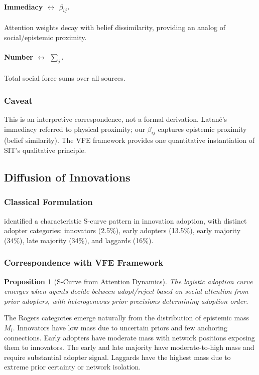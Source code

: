 \documentclass[12pt]{article}
\newtheorem{proposition}[theorem]{Proposition}
\begin{document}
\paragraph{Immediacy $\leftrightarrow$ $\beta_{ij}$.} Attention weights decay with 
belief dissimilarity, providing an analog of social/epistemic proximity.

\paragraph{Number $\leftrightarrow$ $\sum_j$.} Total social force sums over all sources.

\subsubsection{Caveat}

This is an interpretive correspondence, not a formal derivation. Latané's 
immediacy referred to physical proximity; our $\beta_{ij}$ captures epistemic 
proximity (belief similarity). The VFE framework provides one quantitative 
instantiation of SIT's qualitative principle.

\subsection{Diffusion of Innovations}

\subsubsection{Classical Formulation}

\citet{rogers2003diffusion} identified a characteristic S-curve pattern in innovation adoption, with distinct adopter categories: innovators (2.5\%), early adopters (13.5\%), early majority (34\%), late majority (34\%), and laggards (16\%).

\subsubsection{Correspondence with VFE Framework}

\begin{proposition}[S-Curve from Attention Dynamics]
The logistic adoption curve emerges when agents decide between adopt/reject based on social attention from prior adopters, with heterogeneous prior precisions determining adoption order.
\end{proposition}

The Rogers categories emerge naturally from the distribution of epistemic mass $M_i$. Innovators have low mass due to uncertain priors and few anchoring connections. Early adopters have moderate mass with network positions exposing them to innovators. The early and late majority have moderate-to-high mass and require substantial adopter signal. Laggards have the highest mass due to extreme prior certainty or network isolation.
\end{document}
